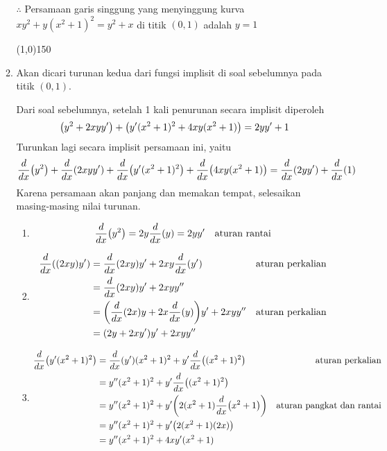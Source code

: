 \begin{enumerate}[leftmargin=*, label={\arabic*}.]
\begin{enumerate}[label={\alph*}.]
    $\therefore$ Persamaan garis singgung yang menyinggung kurva \\
    $xy^{2}+y(x^{2}+1)^{2} = y^{2}+x$ di titik $(0,1)$ adalah $y=1$


\begin{center}\line(1,0){150}\end{center}


    \item Akan dicari turunan kedua dari fungsi implisit di soal sebelumnya 
    pada titik $(0,1)$. 
    
    Dari soal sebelumnya, setelah 1 kali penurunan secara implisit diperoleh
    \[
        \brk*{y^{2} + 2xyy'} + \brk*{y'(x^{2}+1)^{2} 
        + 4xy(x^{2}+1)}= 2yy' + 1
    \]
    Turunkan lagi secara implisit persamaan ini, yaitu
    \[
        \drv{x}{y^{2}}+\drv{x}{2xyy'}+\drv{x}{y'(x^{2}+1)^{2}}+\drv{x}{4xy(x^{2}+1)}
        =\drv{x}{2yy'}+\drv{x}{1}
    \]
    Karena persamaan akan panjang dan memakan tempat, selesaikan masing-masing nilai 
    turunan.
        \begin{enumerate}[label={\arabic*})]
        \item 
        \[
            \drv{x}{y^{2}} = 2y\drv{x}{y} = 2yy' \quad \text{aturan rantai}
        \]
        \item 
        \begin{align*}
            \drv{x}{(2xy)y'} 
            &= \drv{x}{2xy}y' + 2xy\drv{x}{y'}
            &\text{aturan perkalian}\\
            &= \drv{x}{2xy}y' + 2xyy''\\
            &= \brk*{\drv{x}{2x}y + 2x\drv{x}{y}}y' + 2xyy''
            &\text{aturan perkalian}\\
            &=(2y+2xy')y'+2xyy''
        \end{align*}
        \item 
        \begin{align*}
            \drv{x}{y'(x^{2}+1)^{2}} 
            &= \drv{x}{y'}(x^{2}+1)^{2}+y'\drv{x}{(x^{2}+1)^{2}}
            &\text{aturan perkalian}\\
            &= y''(x^{2}+1)^{2} + y'\drv{x}{(x^{2}+1)^{2}}\\
            &=y''(x^{2}+1)^{2} + y'\brk*{2(x^{2}+1)\drv{x}{x^{2}+1}}
            &\text{aturan pangkat dan rantai}\\
            &=y''(x^{2}+1)^{2} + y'\brk*{2(x^{2}+1)(2x)}\\
            &=y''(x^{2}+1)^{2} + 4xy'(x^{2}+1)
        \end{align*}

\end{enumerate}
\end{enumerate}
\end{enumerate}
